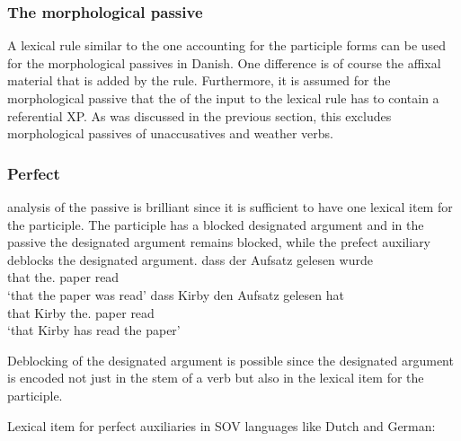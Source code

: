 \subsubsection{The morphological passive}


A lexical rule similar to the one accounting for the participle forms can be used for the
morphological passives in Danish. One difference is of course the affixal material that is added by
the rule. Furthermore, it is assumed for the morphological passive that the \da of the input to the lexical rule has to contain
a referential XP. As was discussed in the previous section, this excludes morphological passives of
unaccusatives and weather verbs. 





\subsubsection{Perfect}

 analysis of the passive is brilliant since it is sufficient to have one lexical
item for the participle. The participle has a blocked designated argument and in the passive the
designated argument remains blocked, while the prefect auxiliary deblocks the designated
argument. 
\eal
\ex
\gll dass der        Aufsatz gelesen wurde\\
     that the.\NOM{} paper   read    \AUX\\
\glt `that the paper was read'
\ex
\gll dass Kirby den Aufsatz gelesen hat\\
     that Kirby the.\ACC{} paper read \AUX\\
\glt `that Kirby has read the paper'
\zl

Deblocking of the designated argument is possible since the designated argument is encoded not just in the stem of a verb
but also in the lexical item for the participle.   

\ea
Lexical item for perfect auxiliaries in SOV languages like Dutch and German:\\
\z



